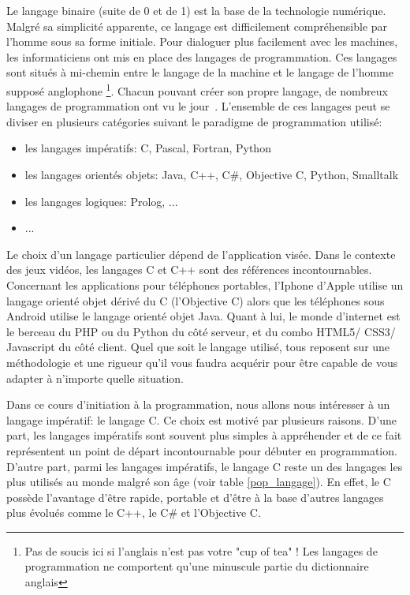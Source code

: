 \documentclass[a4paper,11pt]{book}
\theoremstyle{definition}
\begin{document}
Le langage binaire (suite de 0 et de 1) est la base de la
technologie numérique. Malgré sa simplicité apparente, ce langage
est difficilement compréhensible par l'homme sous sa forme initiale.
Pour dialoguer plus facilement avec les machines, les
informaticiens ont mis en place des langages de programmation. Ces
langages sont situés à mi-chemin entre le langage de la machine et le langage de l'homme supposé anglophone
\footnote{Pas de soucis ici si l'anglais n'est pas votre "cup of
tea" ! Les langages de programmation ne comportent qu'une minuscule
partie du dictionnaire anglais}. Chacun
pouvant créer son propre langage, de nombreux langages de
programmation ont vu le jour~\cite{HIST}. L'ensemble
de ces langages peut se diviser en plusieurs catégories suivant le paradigme de programmation utilisé: 
\begin{itemize}
\item les langages impératifs: C, Pascal, Fortran, Python
\item les langages orientés objets: Java, C++, C\#, Objective C, Python, Smalltalk
\item  les langages logiques: Prolog, ...
\item ...
\end{itemize}
Le choix d'un langage particulier dépend de l'application visée.
Dans le contexte des jeux vidéos, les langages C et C++ sont des
références incontournables. Concernant les applications pour
téléphones portables, l'Iphone d'Apple utilise un langage orienté objet dérivé du C (l'Objective C) alors que les téléphones sous Android utilise le langage orienté objet Java. Quant à lui, le monde d'internet est le berceau du PHP ou du Python du côté serveur, et du combo HTML5/ CSS3/  Javascript du côté client. Quel que soit le langage utilisé, tous reposent sur une méthodologie et une rigueur qu'il vous faudra acquérir pour être capable de vous adapter à n'importe quelle situation.

Dans ce cours d'initiation à la programmation, nous allons nous
intéresser à un langage impératif: le langage C. Ce choix est
motivé par plusieurs raisons. D'une part, les langages impératifs sont
souvent plus simples à appréhender et de ce fait représentent un
point de départ incontournable pour débuter en programmation.
D'autre part, parmi les langages impératifs, le langage C reste
un des langages les plus utilisés au monde malgré son âge (voir table \ref{pop_langage}). En
effet, le C possède l'avantage d'être rapide, portable et d'être à
la base d'autres langages plus évolués comme le C++, le C\# et l'Objective C.
\end{document}
